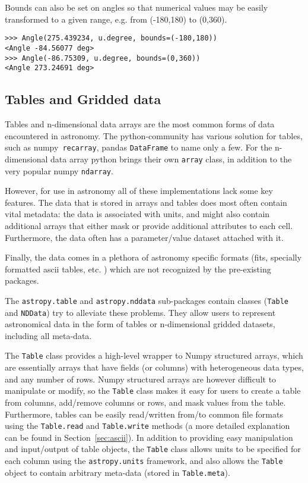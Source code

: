 \documentclass[traditabstract]{aa}
\begin{document}
Bounds can also be set on angles so that numerical
values may be easily transformed to a given range, e.g. from (-180,180) to (0,360).

\begin{verbatim}
>>> Angle(275.439234, u.degree, bounds=(-180,180))
<Angle -84.56077 deg>
>>> Angle(-86.75309, u.degree, bounds=(0,360))
<Angle 273.24691 deg>
\end{verbatim}

\subsection{Tables and Gridded data}


\label{sec:table}

Tables and n-dimensional data arrays are the most common forms of data encountered in astronomy. The \gls{python}-community has various solution for tables, such as \gls{numpy}\ \texttt{recarray}, \gls{pandas} \texttt{DataFrame} to name only a few. For the n-dimensional data array python brings their own \texttt{array} class, in addition to the very popular \gls{numpy} \texttt{ndarray}. 

However, for use in astronomy all of these implementations lack some key features. The data that is stored in arrays and tables does most often contain vital metadata: the data is associated with units, and might also contain additional arrays that either mask or provide additional attributes to each cell. Furthermore, the data often has a parameter/value dataset attached with it. 

Finally, the data comes in a plethora of astronomy specific formats (fits, specially formatted ascii tables, etc. ) which are not recognized by the pre-existing packages. 

The \texttt{astropy.table} and \texttt{astropy.nddata} sub-packages contain
classes (\texttt{Table} and \texttt{NDData})  try to alleviate these problems. They allow users to represent
astronomical data in the form of tables or n-dimensional gridded datasets,
including all meta-data.

The \texttt{Table} class provides a high-level wrapper to Numpy structured
arrays, which are essentially arrays that have fields (or columns) with
heterogeneous data types, and any number of rows. Numpy structured arrays are
however difficult to manipulate or modify, so the \texttt{Table} class makes
it easy for users to create a table from columns, add/remove columns or rows,
and mask values from the table. Furthermore, tables can be easily
read/written from/to common file formats using the \texttt{Table.read} and
\texttt{Table.write} methods (a more detailed explanation can be found in Section~\ref{sec:ascii}). In addition to providing easy manipulation and
input/output of table objects, the \texttt{Table} class allows units to be
specified for each column using the \texttt{astropy.units} framework, and
also allows the \texttt{Table} object to contain arbitrary meta-data (stored
in \texttt{Table.meta}).
\end{document}
